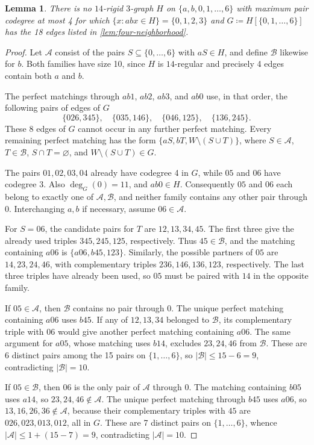 \documentclass[10pt]{article}
\numberwithin{equation}{section}
\newtheorem{lemma}[lemma]{Lemma}
\theoremstyle{definition}
\begin{document}
\begin{lemma}\label{lem:four-normal-form-extension}
There is no $14$-rigid $3$-graph $H$ on $\{a,b,0,1,\ldots,6\}$ with maximum pair codegree at most 4 for which $\{x\colon abx\in H\}=\{0,1,2,3\}$ and $G\coloneqq H[\{0,1,\ldots,6\}]$ has the 18 edges listed in \cref{lem:four-neighborhood}.
\end{lemma}
\begin{proof}
Let $\mathcal A$ consist of the pairs $S\subseteq\{0,\ldots,6\}$ with $aS\in H$, and define $\mathcal B$ likewise for $b$. Both families have size 10, since $H$ is $14$-regular and precisely 4 edges contain both $a$ and $b$.

The perfect matchings through $ab1$, $ab2$, $ab3$, and $ab0$ use, in that order, the following pairs of edges of $G$
\[
 \{026,345\},\quad \{035,146\},\quad
 \{046,125\},\quad \{136,245\}.
\]
These 8 edges of $G$ cannot occur in any further perfect matching. Every remaining perfect matching has the form $\{aS,bT,W\setminus(S\cup T)\}$, where $S\in\mathcal A$, $T\in\mathcal B$, $S\cap T=\varnothing$, and $W\setminus(S\cup T)\in G$.

The pairs $01,02,03,04$ already have codegree 4 in $G$, while $05$ and $06$ have codegree 3. Also $\deg_G(0)=11$, and $ab0\in H$. Consequently $05$ and $06$ each belong to exactly one of $\mathcal A,\mathcal B$, and neither family contains any other pair through $0$. Interchanging $a,b$ if necessary, assume $06\in\mathcal A$.

For $S=06$, the candidate pairs for $T$ are $12,13,34,45$. The first three give the already used triples $345,245,125$, respectively. Thus $45\in\mathcal B$, and the matching containing $a06$ is $\{a06,b45,123\}$. Similarly, the possible partners of $05$ are $14,23,24,46$, with complementary triples $236,146,136,123$, respectively. The last three triples have already been used, so $05$ must be paired with $14$ in the opposite family.

If $05\in\mathcal A$, then $\mathcal B$ contains no pair through $0$. The unique perfect matching containing $a06$ uses $b45$. If any of $12,13,34$ belonged to $\mathcal B$, its complementary triple with $06$ would give another perfect matching containing $a06$. The same argument for $a05$, whose matching uses $b14$, excludes $23,24,46$ from $\mathcal B$. These are 6 distinct pairs among the 15 pairs on $\{1,\ldots,6\}$, so $|\mathcal B|\le15-6=9$, contradicting $|\mathcal B|=10$.

If $05\in\mathcal B$, then $06$ is the only pair of $\mathcal A$ through $0$. The matching containing $b05$ uses $a14$, so $23,24,46\notin\mathcal A$. The unique perfect matching through $b45$ uses $a06$, so $13,16,26,36\notin\mathcal A$, because their complementary triples with $45$ are $026,023,013,012$, all in $G$. These are 7 distinct pairs on $\{1,\ldots,6\}$, whence $|\mathcal A|\le1+(15-7)=9$, contradicting $|\mathcal A|=10$.
\end{proof}
\end{document}
